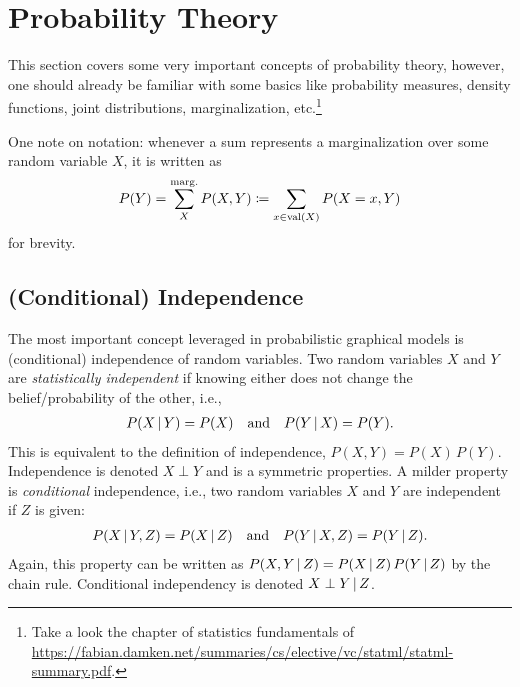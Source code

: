 	\section{Probability Theory}
		This section covers some very important concepts of probability theory, however, one should already be familiar with some basics like probability measures, density functions, joint distributions, marginalization, etc.\footnote{Take a look the chapter of statistics fundamentals of \url{https://fabian.damken.net/summaries/cs/elective/vc/statml/statml-summary.pdf}.}

		One note on notation: whenever a sum represents a marginalization over some random variable \(X\), it is written as
		\begin{equation}
		P(Y) = \sum_{X}^{\operatorname{marg.}} P(X, Y) \coloneqq \sum_{x \in \operatorname{val}(X)} P(X = x, Y)
		\end{equation}
		for brevity.

		\subsection{(Conditional) Independence}
			\label{subsec:condIndependence}

			The most important concept leveraged in probabilistic graphical models is (conditional) independence of random variables. Two random variables \(X\) and \(Y\) are \emph{statistically independent} if knowing either does not change the belief/probability of the other, i.e.,
			\begin{gather}
				P(X \,\vert\, Y) = P(X)
				\quad\text{and}\quad
				P(Y \,\vert\, X) = P(Y).
			\end{gather}
			This is equivalent to the definition of independence, \( P(X, Y) = P(X) \, P(Y) \). Independence is denoted \( X \perp Y \) and is a symmetric properties. A milder property is \emph{conditional} independence, i.e., two random variables \(X\) and \(Y\) are independent if \(Z\) is given:
			\begin{gather}
				P(X \,\vert\, Y, Z) = P(X \,\vert\, Z)
				\quad\text{and}\quad
				P(Y \,\vert\, X, Z) = P(Y \,\vert\, Z).
			\end{gather}
			Again, this property can be written as \( P(X, Y \,\vert\, Z) = P(X \,\vert\, Z) \, P(Y \,\vert\, Z) \) by the chain rule. Conditional independency is denoted \( X \perp Y \,\vert\, Z \).

